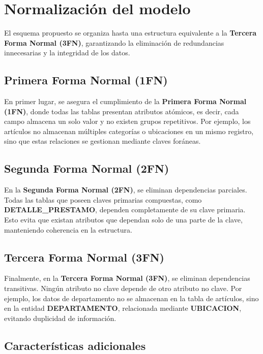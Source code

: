 \documentclass{article}
\begin{document}
\section{Normalización del modelo}

El esquema propuesto se organiza hasta una estructura equivalente a la \textbf{Tercera Forma Normal (3FN)}, garantizando la eliminación de redundancias innecesarias y la integridad de los datos.

\subsection{Primera Forma Normal (1FN)}

En primer lugar, se asegura el cumplimiento de la \textbf{Primera Forma Normal (1FN)}, donde todas las tablas presentan atributos atómicos, es decir, cada campo almacena un solo valor y no existen grupos repetitivos. Por ejemplo, los artículos no almacenan múltiples categorías o ubicaciones en un mismo registro, sino que estas relaciones se gestionan mediante claves foráneas.

\subsection{Segunda Forma Normal (2FN)}

En la \textbf{Segunda Forma Normal (2FN)}, se eliminan dependencias parciales. Todas las tablas que poseen claves primarias compuestas, como \textbf{DETALLE\_PRESTAMO}, dependen completamente de su clave primaria. Esto evita que existan atributos que dependan solo de una parte de la clave, manteniendo coherencia en la estructura.

\subsection{Tercera Forma Normal (3FN)}

Finalmente, en la \textbf{Tercera Forma Normal (3FN)}, se eliminan dependencias transitivas. Ningún atributo no clave depende de otro atributo no clave. Por ejemplo, los datos de departamento no se almacenan en la tabla de artículos, sino en la entidad \textbf{DEPARTAMENTO}, relacionada mediante \textbf{UBICACION}, evitando duplicidad de información.

\subsection{Características adicionales}
\end{document}
